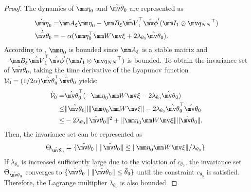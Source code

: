 \documentclass[letterpaper, 10 pt, conference]{ieeeconf}  %
\begin{document}
\begin{proof}
The dynamics of ${\mm \eta}_0$ and ${\hat{\mv\theta}}_0$ are represented as
\begin{equation}
    \begin{aligned}     
        \dot{\mm \eta}_0 =& 
        \mm A_\xi{\mm \eta}_0 -\mm B_\xi 
        \hat {\mm V}_1^\top \hat{\mv\phi}'(\mm I_1\otimes {\mv q_{NN}}^\top )
        \\
        \dot{{\hat{\mv\theta}}}_0
        =&
        -\alpha 
        (
            {\mm \eta}_0^\top \mm W\mv \xi+2\lambda_{\theta_0} {\hat{\mv\theta}}_0
        )
        .
    \end{aligned}
\end{equation}
According to \cite[Chap.~4 T.~1.9]{Desoer:2009aa}, ${\mm \eta}_0$ is bounded since $\mm A_\xi$ is a stable matrix and $-\mm B_\xi\hat {\mm V}_1^\top \hat{\mv\phi}'(\mm I_1\otimes {\mv q_{NN}}^\top )$ is bounded.
To obtain the invariance set of ${\hat{\mv\theta}}_0$, taking the time derivative of the Lyapunov function $\mathcal V_0=(1/2\alpha){\hat{\mv\theta}}_0^\top {\hat{\mv\theta}}_0$ yields:
\begin{equation}
    \begin{aligned}
        \dot {\mathcal V}_0 =& 
        {\hat{\mv\theta}}_0^\top (-{\mm \eta}_0\mm W\mv \xi -2\lambda_{\theta_0}{\hat{\mv\theta}}_0)
        \\
        \le &
        \Vert{\hat{\mv\theta}}_0\Vert \Vert {\mm \eta}_0\mm W\mv \xi\Vert -2\lambda_{\theta_0} {\hat{\mv\theta}}_0^\top {\hat{\mv\theta}}_0
        \\
        \le &
        -2\lambda_{\theta_0} \Vert{\hat{\mv\theta}}_0\Vert^2 + \Vert {\mm \eta}_0\mm W\mv \xi\Vert \Vert {\hat{\mv\theta}}_0\Vert 
        .
    \end{aligned}
\end{equation}
Then, the invariance set can be represented as 
\begin{equation}
    \Theta_{{\hat{\mv\theta}}_0} =
    \{
        {\hat{\mv\theta}}_0\mid\Vert{\hat{\mv\theta}}_0\Vert 
        \le
        \Vert{\mm \eta}_0\mm W\mv \xi\Vert/\lambda_{\theta_0}
    \}
    .    
\end{equation}
If $\lambda_{\theta_0}$ is increased sufficiently large due to the violation of $c_{\theta_0}$, the invariance set $\Theta_{{\hat{\mv\theta}}_0}$ converges to $\{{\hat{\mv\theta}}_0\ \vert \ \Vert{\hat{\mv\theta}}_0\Vert \le \bar\theta_0\}$ until the constraint $c_{\theta_0}$ is satisfied.
Therefore, the Lagrange multiplier $\lambda_{\theta_0}$ is also bounded.

\end{proof}
\end{document}
